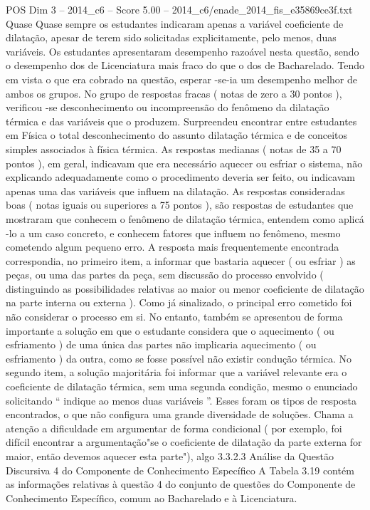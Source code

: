 \begin{textsample}{POS Dim 3 – 2014\_c6 – Score 5.00 – 2014\_c6/enade\_2014\_fis\_e35869ce3f.txt}
Quase Quase sempre os estudantes indicaram apenas a variável coeficiente de dilatação, apesar de terem sido solicitadas explicitamente, pelo menos, duas variáveis.
Os estudantes apresentaram desempenho razoável nesta questão, sendo o desempenho dos de Licenciatura mais fraco do que o dos de Bacharelado.
Tendo em vista o que era cobrado na questão, esperar -se-ia um desempenho melhor de ambos os grupos.
No grupo de respostas fracas ( notas de zero a 30 pontos ), verificou -se desconhecimento ou incompreensão do fenômeno da dilatação térmica e das variáveis que o produzem.
Surpreendeu encontrar entre estudantes em Física o total desconhecimento do assunto dilatação térmica e de conceitos simples associados à física térmica.
As respostas medianas ( notas de 35 a 70 pontos ), em geral, indicavam que era necessário aquecer ou esfriar o sistema, não explicando adequadamente como o procedimento deveria ser feito, ou indicavam apenas uma das variáveis que influem na dilatação.
As respostas consideradas boas ( notas iguais ou superiores a 75 pontos ), são respostas de estudantes que mostraram que conhecem o fenômeno de dilatação térmica, entendem como aplicá -lo a um caso concreto, e conhecem fatores que influem no fenômeno, mesmo cometendo algum pequeno erro.
A resposta mais frequentemente encontrada correspondia, no primeiro item, a informar que bastaria aquecer ( ou esfriar ) as peças, ou uma das partes da peça, sem discussão do processo envolvido ( distinguindo as possibilidades relativas ao maior ou menor coeficiente de dilatação na parte interna ou externa ).
Como já sinalizado, o principal erro cometido foi não considerar o processo em si.
No entanto, também se apresentou de forma importante a solução em que o estudante considera que o aquecimento ( ou esfriamento ) de uma única das partes não implicaria aquecimento ( ou esfriamento ) da outra, como se fosse possível não existir condução térmica.
No segundo item, a solução majoritária foi informar que a variável relevante era o coeficiente de dilatação térmica, sem uma segunda condição, mesmo o enunciado solicitando “ indique ao menos duas variáveis ”.
Esses foram os tipos de resposta encontrados, o que não configura uma grande diversidade de soluções.
Chama a atenção a dificuldade em argumentar de forma condicional ( por exemplo, foi difícil encontrar a argumentação"se o coeficiente de dilatação da parte externa for maior, então devemos aquecer esta parte"), algo 3.3.2.3 Análise da Questão Discursiva 4 do Componente de Conhecimento Específico A Tabela 3.19 contém as informações relativas à questão 4 do conjunto de questões do Componente de Conhecimento Específico, comum ao Bacharelado e à Licenciatura.

\end{textsample}

